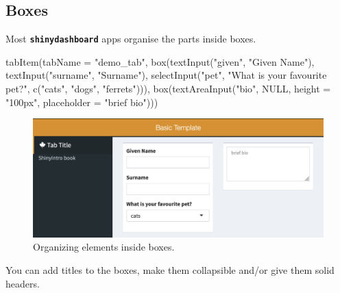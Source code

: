 \documentclass[
  oneside]{book}
\newenvironment{Shaded}{\begin{snugshade}}{\end{snugshade}}
\newcommand{\AttributeTok}[1]{\textcolor[rgb]{0.77,0.63,0.00}{#1}}
\newcommand{\ConstantTok}[1]{\textcolor[rgb]{0.00,0.00,0.00}{#1}}
\newcommand{\FunctionTok}[1]{\textcolor[rgb]{0.00,0.00,0.00}{#1}}
\newcommand{\NormalTok}[1]{#1}
\newcommand{\StringTok}[1]{\textcolor[rgb]{0.31,0.60,0.02}{#1}}
\begin{document}
\hypertarget{boxes}{%
\subsection{Boxes}\label{boxes}}

Most \textbf{\texttt{shinydashboard}} apps organise the parts inside boxes.

\begin{Shaded}
\begin{Highlighting}[]
\FunctionTok{tabItem}\NormalTok{(}\AttributeTok{tabName =} \StringTok{"demo\_tab"}\NormalTok{, }\FunctionTok{box}\NormalTok{(}\FunctionTok{textInput}\NormalTok{(}\StringTok{"given"}\NormalTok{, }\StringTok{"Given Name"}\NormalTok{), }\FunctionTok{textInput}\NormalTok{(}\StringTok{"surname"}\NormalTok{,}
    \StringTok{"Surname"}\NormalTok{), }\FunctionTok{selectInput}\NormalTok{(}\StringTok{"pet"}\NormalTok{, }\StringTok{"What is your favourite pet?"}\NormalTok{, }\FunctionTok{c}\NormalTok{(}\StringTok{"cats"}\NormalTok{, }\StringTok{"dogs"}\NormalTok{,}
    \StringTok{"ferrets"}\NormalTok{))), }\FunctionTok{box}\NormalTok{(}\FunctionTok{textAreaInput}\NormalTok{(}\StringTok{"bio"}\NormalTok{, }\ConstantTok{NULL}\NormalTok{, }\AttributeTok{height =} \StringTok{"100px"}\NormalTok{, }\AttributeTok{placeholder =} \StringTok{"brief bio"}\NormalTok{)))}
\end{Highlighting}
\end{Shaded}

\begin{figure}

{\centering \includegraphics[width=1\linewidth]{images/sdb_layout2} 

}

\caption{Organizing elements inside boxes.}\label{fig:sdb-layout2}
\end{figure}

You can add titles to the boxes, make them collapsible and/or give them solid headers.
\end{document}
